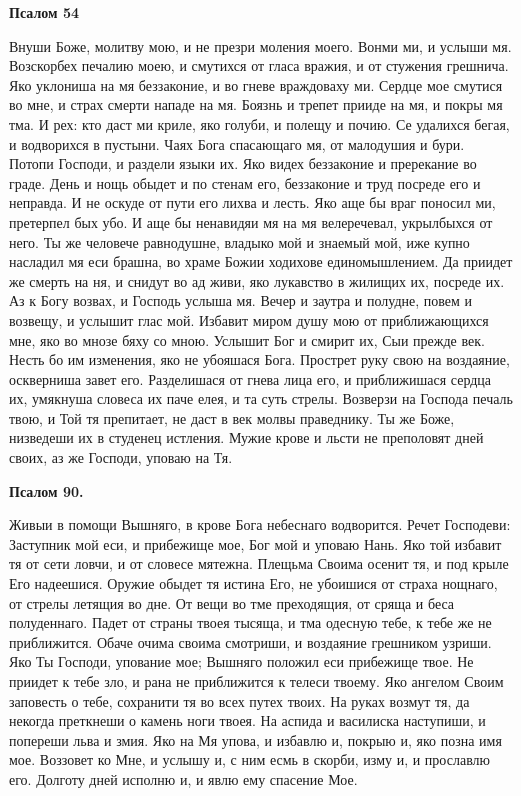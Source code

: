 \bfseries Псалом 54\normalfont{}


Внуши Боже, молитву мою, и не презри моления моего. Вонми ми, и услыши мя. Возскорбех печалию моею, и смутихся от гласа вражия, и от стужения грешнича. Яко уклониша на мя беззаконие, и во гневе враждоваху ми. Сердце мое смутися во мне, и страх смерти нападе на мя. Боязнь и трепет прииде на мя, и покры мя тма. И рех: кто даст ми криле, яко голуби, и полещу и почию. Се удалихся бегая, и водворихся в пустыни. Чаях Бога спасающаго мя, от малодушия и бури. Потопи Господи, и раздели языки их. Яко видех беззаконие и пререкание во граде. День и нощь обыдет и по стенам его, беззаконие и труд посреде его и неправда. И не оскуде от пути его лихва и лесть. Яко аще бы враг поносил ми, претерпел бых убо. И аще бы ненавидяи мя на мя велеречевал, укрылбыхся от него. Ты же человече равнодушне, владыко мой и знаемый мой, иже купно насладил мя еси брашна, во храме Божии ходихове единомышлением. Да приидет же смерть на ня, и снидут во ад живи, яко лукавство в жилищих их, посреде их. Аз к Богу возвах, и Господь услыша мя. Вечер и заутра и полудне, повем и возвещу, и услышит глас мой. Избавит миром душу мою от приближающихся мне, яко во мнозе бяху со мною. Услышит Бог и смирит их, Сыи прежде век. Несть бо им изменения, яко не убояшася Бога. Прострет руку свою на воздаяние, оскверниша завет его. Разделишася от гнева лица его, и приближишася сердца их, умякнуша словеса их паче елея, и та суть стрелы. Возверзи на Господа печаль твою, и Той тя препитает, не даст в век молвы праведнику. Ты же Боже, низведеши их в студенец истления. Мужие крове и льсти не преполовят дней своих, аз же Господи, уповаю на Тя.





\bfseries Псалом 90.\normalfont{}


Живыи в помощи Вышняго, в крове Бога небеснаго водворится. Речет Господеви: Заступник мой еси, и прибежище мое, Бог мой и уповаю Нань. Яко той избавит тя от сети ловчи, и от словесе мятежна. Плещьма Своима осенит тя, и под крыле Его надеешися. Оружие обыдет тя истина Его, не убоишися от страха нощнаго, от стрелы летящия во дне. От вещи во тме преходящия, от сряща и беса полуденнаго. Падет от страны твоея тысяща, и тма одесную тебе, к тебе же не приближится. Обаче очима своима смотриши, и воздаяние грешником узриши. Яко Ты Господи, упование мое; Вышняго положил еси прибежище твое. Не приидет к тебе зло, и рана не приближится к телеси твоему. Яко ангелом Своим заповесть о тебе, сохранити тя во всех путех твоих. На руках возмут тя, да некогда преткнеши о камень ноги твоея. На аспида и василиска наступиши, и попереши льва и змия. Яко на Мя упова, и избавлю и, покрыю и, яко позна имя мое. Воззовет ко Мне, и услышу и, с ним есмь в скорби, изму и, и прославлю его. Долготу дней исполню и, и явлю ему спасение Мое.


